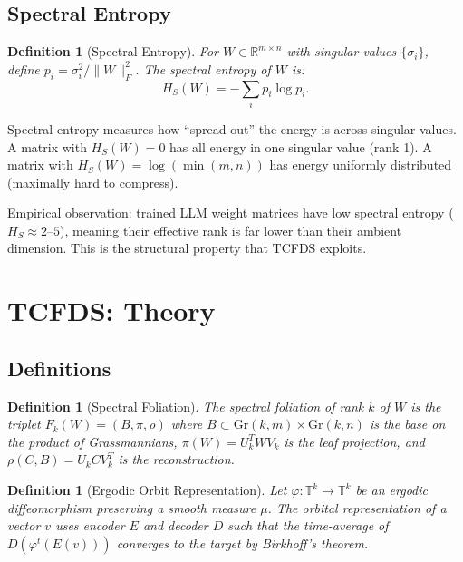\documentclass[11pt,a4paper]{article}
\newtheorem{definition}[theorem]{Definition}
\begin{document}
\subsection{Spectral Entropy}

\begin{definition}[Spectral Entropy]\label{def:entropy}
For $W \in \mathbb{R}^{m \times n}$ with singular values $\{\sigma_i\}$, define $p_i = \sigma_i^2 / \|W\|_F^2$. The spectral entropy of $W$ is:
\begin{equation}
    H_S(W) = -\sum_i p_i \log p_i.
\end{equation}
\end{definition}

Spectral entropy measures how ``spread out'' the energy is across singular values. A matrix with $H_S(W) = 0$ has all energy in one singular value (rank 1). A matrix with $H_S(W) = \log(\min(m,n))$ has energy uniformly distributed (maximally hard to compress).

Empirical observation: trained LLM weight matrices have low spectral entropy ($H_S \approx 2$--$5$), meaning their effective rank is far lower than their ambient dimension. This is the structural property that TCFDS exploits.

\section{TCFDS: Theory}

\subsection{Definitions}

\begin{definition}[Spectral Foliation]\label{def:foliation}
The spectral foliation of rank $k$ of $W$ is the triplet $F_k(W) = (B, \pi, \rho)$ where $B \subset \mathrm{Gr}(k,m) \times \mathrm{Gr}(k,n)$ is the base on the product of Grassmannians, $\pi(W) = U_k^T W V_k$ is the leaf projection, and $\rho(C, B) = U_k C V_k^T$ is the reconstruction.
\end{definition}

\begin{definition}[Ergodic Orbit Representation]\label{def:ergodic}
Let $\varphi : \mathbb{T}^k \to \mathbb{T}^k$ be an ergodic diffeomorphism preserving a smooth measure $\mu$. The orbital representation of a vector $v$ uses encoder $E$ and decoder $D$ such that the time-average of $D(\varphi^t(E(v)))$ converges to the target by Birkhoff's theorem.
\end{definition}
\end{document}
